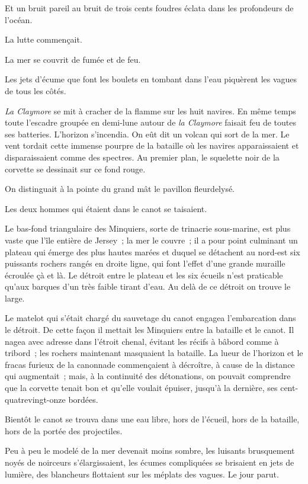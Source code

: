 \documentclass[french,twoside]{book} %
\begin{document}
Et un bruit pareil au bruit de trois cents foudres éclata dans les profondeurs de l’océan.\par
La lutte commençait.\par
La mer se couvrit de fumée et de feu.\par
Les jets d’écume que font les boulets en tombant dans l’eau piquèrent les vagues de tous les côtés.\par
\emph{La Claymore} se mit à cracher de la flamme sur les huit navires. En même temps toute l’escadre groupée en demi-lune autour de \emph{la Claymore} faisait feu de toutes ses batteries. L’horizon s’incendia. On eût dit un volcan qui sort de la mer. Le vent tordait cette  immense pourpre de la bataille où les navires apparaissaient et disparaissaient comme des spectres. Au premier plan, le squelette noir de la corvette se dessinait sur ce fond rouge.\par
On distinguait à la pointe du grand mât le pavillon fleurdelysé.\par
Les deux hommes qui étaient dans le canot se taisaient.\par
Le bas-fond triangulaire des Minquiers, sorte de trinacrie sous-marine, est plus vaste que l’île entière de Jersey ; la mer le couvre ; il a pour point culminant un plateau qui émerge des plus hautes marées et duquel se détachent au nord-est six puissants rochers rangés en droite ligne, qui font l’effet d’une grande muraille écroulée çà et là. Le détroit entre le plateau et les six écueils n’est praticable qu’aux barques d’un très faible tirant d’eau. Au delà de ce détroit on trouve le large.\par
Le matelot qui s’était chargé du sauvetage du canot engagea l’embarcation dans le détroit. De cette façon il mettait les Minquiers entre la bataille et le canot. Il nagea avec adresse dans l’étroit chenal, évitant les récifs à bâbord comme à tribord ; les rochers maintenant masquaient la bataille. La lueur de l’horizon et le fracas furieux de la canonnade commençaient à décroître, à cause de la distance qui augmentait ; mais, à la continuité des détonations, on pouvait comprendre que la corvette tenait bon et qu’elle voulait épuiser, jusqu’à la dernière, ses cent-quatrevingt-onze bordées.\par
Bientôt le canot se trouva dans une eau libre, hors  de l’écueil, hors de la bataille, hors de la portée des projectiles.\par
Peu à peu le modelé de la mer devenait moins sombre, les luisants brusquement noyés de noirceurs s’élargissaient, les écumes compliquées se brisaient en jets de lumière, des blancheurs flottaient sur les méplats des vagues. Le jour parut.\par
\end{document}
